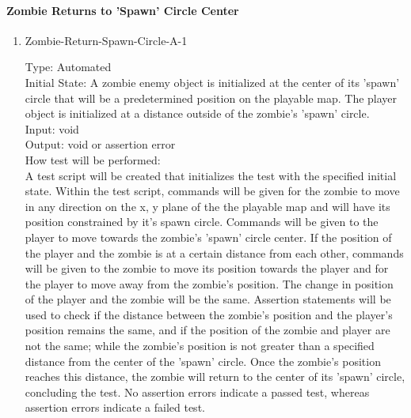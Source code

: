 \documentclass[12pt, titlepage]{article}
\begin{document}
\paragraph{Zombie Returns to 'Spawn' Circle Center}

\begin{enumerate}

\item{Zombie-Return-Spawn-Circle-A-1\\}

Type: Automated\\
					
Initial State: A zombie enemy object is initialized at the center of its 'spawn' circle that will be a predetermined position on the playable map. The player object is initialized at a distance outside of the zombie's 'spawn' circle.\\
					
Input: void \\
					
Output: void or assertion error \\
					
How test will be performed:\\ A test script will be created that initializes the test with the specified initial state. Within the test script, commands will be given for the zombie to move in any direction on the x, y plane of the the playable map and will have its position constrained by it's spawn circle. Commands will be given to the player to move towards the zombie's 'spawn' circle center. If the position of the player and the zombie is at a certain distance from each other, commands will be given to the zombie to move its position towards the player and for the player to move away from the zombie's position. The change in position of the player and the zombie will be the same. Assertion statements will be used to check if the distance between the zombie's position and the player's position remains the same, and if the position of the zombie and player are not the same; while the zombie's position is not greater than a specified distance from the center of the 'spawn' circle. Once the zombie's position reaches this distance, the zombie will return to the center of its 'spawn' circle, concluding the test. No assertion errors indicate a passed test, whereas assertion errors indicate a failed test.\\

\end{enumerate}
\end{document}
